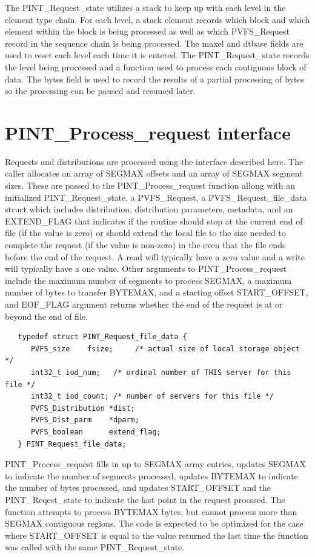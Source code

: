 \documentclass[12pt]{article} %
\begin{document}
The PINT\_Request\_state utilizes a stack to keep up with each level in the
element type chain.  For each level, a stack element records which block
and which element within the block is being processed as well as which
PVFS\_Request record in the sequence chain is being processed.  The
maxel and dtbase fields are used to reset each level each time it is
entered.  The PINT\_Request\_state records the level being processed
and a function used to process each contiguous block of data.  The bytes
field is used to record the results of a partial processing of bytes so
the processing can be paused and resumed later.

\section{PINT\_Process\_request interface}

Requests and distributions are processed using the interface described
here.  The caller allocates an array of SEGMAX offsets and an array of
SEGMAX segment sizes.  These are passed to the PINT\_Process\_request function
allong with an initialized PINT\_Request\_state, a PVFS\_Request, a
PVFS\_Request\_file\_data struct which includes distribution, distribution
parameters, metadata, and an EXTEND\_FLAG that indicates if the routine
should stop at the current end of file (if the value is zero) or should
extend the local file to the size needed to complete the request (if the
value is non-zero) in the even that the file ends before the end of the
request. A read will typically have a zero value and a write will
typically have a one value.  Other arguments to PINT\_Process\_request
include the maximum number of segments to process SEGMAX,
a maximum number of bytes to transfer BYTEMAX,
and a starting offset START\_OFFSET, and EOF\_FLAG argument returns
whether the end of the request is at or beyond the end of file.

\begin{verbatim}
   typedef struct PINT_Request_file_data {
      PVFS_size    fsize;     /* actual size of local storage object */
      int32_t iod_num;   /* ordinal number of THIS server for this file */
      int32_t iod_count; /* number of servers for this file */
      PVFS_Distribution *dist;
      PVFS_Dist_parm    *dparm;
      PVFS_boolean      extend_flag;
   } PINT_Request_file_data;
\end{verbatim}

PINT\_Process\_request fills in up to SEGMAX array entries, updates
SEGMAX to indicate the number of segments processed, updates BYTEMAX
to indicate the number of bytes processed, and updates START\_OFFSET and the
PINT\_Reqest\_state to indicate the last point in the request procssed.
The function attempts to process BYTEMAX bytes, but cannot process more
than SEGMAX contiguous regions.  The code is expected to be optimized
for the case where START\_OFFSET is equal to the value returned the last time
the function was called with the same PINT\_Request\_state.
\end{document}
